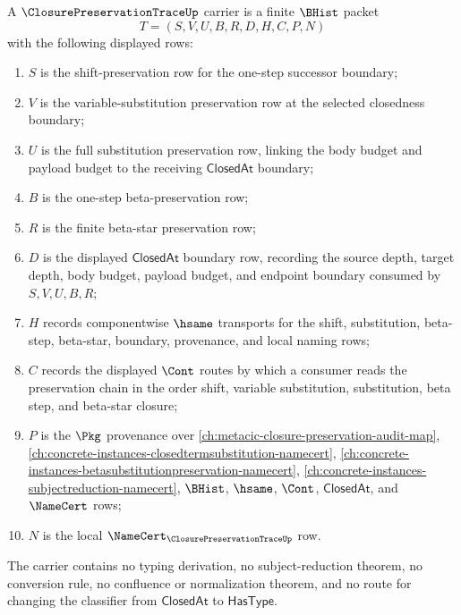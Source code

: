 \begin{definition}
\label{def:closure-preservation-trace-carrier}
A $\ClosurePreservationTraceUp$ carrier is a finite $\BHist$ packet
$$
T=(S,V,U,B,R,D,H,C,P,N)
$$
with the following displayed rows:
\begin{enumerate}
\item $S$ is the shift-preservation row for the one-step successor boundary;
\item $V$ is the variable-substitution preservation row at the selected closedness boundary;
\item $U$ is the full substitution preservation row, linking the body budget and payload budget to the receiving $\mathsf{ClosedAt}$ boundary;
\item $B$ is the one-step beta-preservation row;
\item $R$ is the finite beta-star preservation row;
\item $D$ is the displayed $\mathsf{ClosedAt}$ boundary row, recording the source depth, target depth, body budget, payload budget, and endpoint boundary consumed by $S,V,U,B,R$;
\item $H$ records componentwise $\hsame$ transports for the shift, substitution, beta-step, beta-star, boundary, provenance, and local naming rows;
\item $C$ records the displayed $\Cont$ routes by which a consumer reads the preservation chain in the order shift, variable substitution, substitution, beta step, and beta-star closure;
\item $P$ is the $\Pkg$ provenance over \autoref{ch:metacic-closure-preservation-audit-map}, \autoref{ch:concrete-instances-closedtermsubstitution-namecert}, \autoref{ch:concrete-instances-betasubstitutionpreservation-namecert}, \autoref{ch:concrete-instances-subjectreduction-namecert}, $\BHist$, $\hsame$, $\Cont$, $\mathsf{ClosedAt}$, and $\NameCert$ rows;
\item $N$ is the local $\NameCert_{\ClosurePreservationTraceUp}$ row.
\end{enumerate}
The carrier contains no typing derivation, no subject-reduction theorem, no conversion rule, no confluence or normalization theorem, and no route for changing the classifier from $\mathsf{ClosedAt}$ to $\mathsf{HasType}$.
\end{definition}

